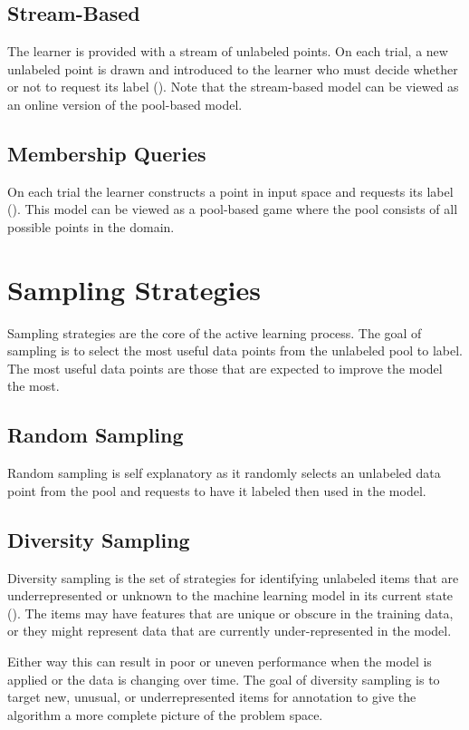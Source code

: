 \subsection{Stream-Based}
The learner is provided with a stream of unlabeled points. On each trial, a new unlabeled point is drawn and introduced to the learner who must decide whether or not to request its label (\cite{baram2004online}). Note that the stream-based model can be viewed as an online version of the pool-based model. 

\subsection{Membership Queries}
On each trial the learner constructs a point in input space and requests its label (\cite{baram2004online}). This model can be viewed as a pool-based game where the pool consists of all possible points in the domain.

\section{Sampling Strategies}

Sampling strategies are the core of the active learning process. The goal of sampling is to select the most useful data points from the unlabeled pool to label. The most useful data points are those that are expected to improve the model the most.

\subsection{Random Sampling}
Random sampling is self explanatory as it randomly selects an unlabeled data point from the pool and requests to have it labeled then used in the model.

\subsection{Diversity Sampling}
Diversity sampling is the set of strategies for identifying unlabeled items that are underrepresented or unknown to the machine learning model in its current state (\cite{munro2021human}). The items may have features that are unique or obscure in the training data, or they might represent data that are currently under-represented in the model. 

Either way this can result in poor or uneven performance when the model is applied or the data is changing over time. The goal of diversity sampling is to target new, unusual, or underrepresented items for annotation to give the algorithm a more complete picture of the problem space. 

